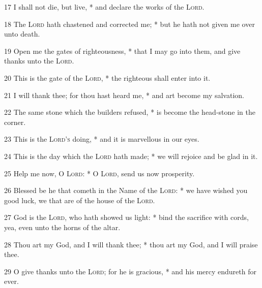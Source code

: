     17 I shall not die, but live, * and declare the works of the \textsc{Lord}.
\par
    18 The \textsc{Lord} hath chastened and corrected me; * but he hath not given me over unto death.
\par
    19 Open me the gates of righteousness, * that I may go into them, and give thanks unto the \textsc{Lord}.
\par
    20 This is the gate of the \textsc{Lord}, * the righteous shall enter into it.
\par
    21 I will thank thee; for thou hast heard me, * and art become my salvation.
\par
    22 The same stone which the builders refused, * is become the head-stone in the corner.
\par
    23 This is the \textsc{Lord's} doing, * and it is marvellous in our eyes.
\par
    24 This is the day which the \textsc{Lord} hath made; * we will rejoice and be glad in it.
\par
    25 Help me now, O \textsc{Lord}: * O \textsc{Lord}, send us now prosperity.
\par
    26 Blessed be he that cometh in the Name of the \textsc{Lord}: * we have wished you good luck, we that are of the house of the \textsc{Lord}.
\par
    27 God is the \textsc{Lord}, who hath showed us light: * bind the sacrifice with cords, yea, even unto the horns of the altar.
\par
    28 Thou art my God, and I will thank thee; * thou art my God, and I will praise thee.
\par
    29 O give thanks unto the \textsc{Lord}; for he is gracious, * and his mercy endureth for ever.
